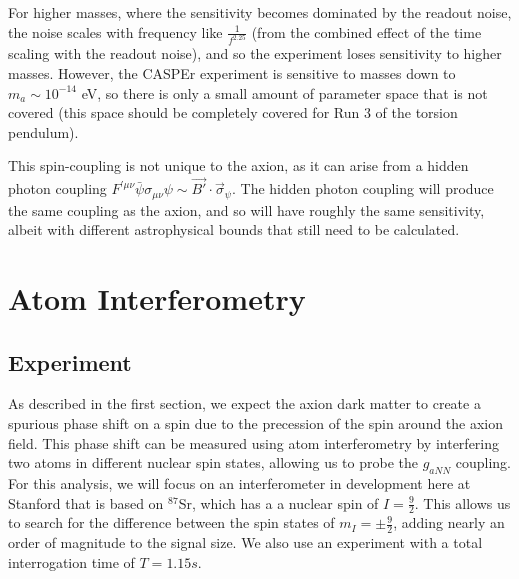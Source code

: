 \documentclass[aps,prd,final,letterpaper]{revtex4}
\begin{document}
For higher masses, where the sensitivity becomes dominated by the readout noise, the noise scales with frequency like $\frac{1}{f^{2.25}}$ (from the combined effect of the time scaling with the readout noise), and so the experiment loses sensitivity to higher masses. However, the CASPEr experiment is sensitive to masses down to $m_a \sim 10^{-14}$ eV, so there is only a small amount of parameter space that is not covered (this space should be completely covered for Run 3 of the torsion pendulum).

This spin-coupling is not unique to the axion, as it can arise from a hidden photon coupling $F^{'\mu\nu}\bar{\psi}\sigma_{\mu\nu}\psi \sim \vec{B'}\cdot\vec{\sigma}_{\psi}$. The hidden photon coupling will produce the same coupling as the axion, and so will have roughly the same sensitivity, albeit with different astrophysical bounds that still need to be calculated. 

\section{Atom Interferometry}





\subsection{Experiment}

As described in the first section, we expect the axion dark matter to create a spurious phase shift on a spin due to the precession of the spin around the axion field. This phase shift can be measured using atom interferometry by interfering two atoms in different nuclear spin states, allowing us to probe the $g_{aNN}$ coupling. For this analysis, we will focus on an interferometer in development here at Stanford that is based on $^{87}$Sr, which has a a nuclear spin of $I = \frac{9}{2}$. This allows us to search for the difference between the spin states of $m_{I} = \pm \frac{9}{2}$, adding nearly an order of magnitude to the signal size. We also use an experiment with a total interrogation time of $T = 1.15 s$. 
\end{document}
